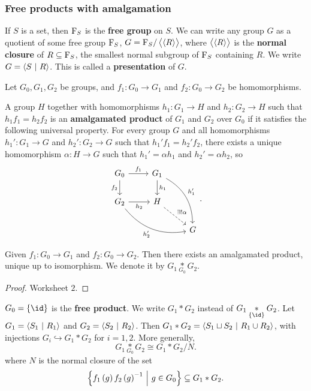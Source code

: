 \subsubsection{Free products with amalgamation}

\begin{definition*}
If $ S $ is a set, then $ \mathrm{F}_S $ is the \textbf{free group} on $ S $. We can write any group $ G $ as a quotient of some free group $ \mathrm{F}_S $, $ G = \mathrm{F}_S / \left\langle \left\langle R \right\rangle \right\rangle $, where $ \left\langle \left\langle R \right\rangle \right\rangle $ is the \textbf{normal closure} of $ R \subseteq \mathrm{F}_S $, the smallest normal subgroup of $ \mathrm{F}_S $ containing $ R $. We write $ G = \left\langle S \ \middle| \  R \right\rangle $. This is called a \textbf{presentation} of $ G $.
\end{definition*}

Let $ G_0, G_1, G_2 $ be groups, and $ f_1 : G_0 \to G_1 $ and $ f_2 : G_0 \to G_2 $ be homomorphisms.

\begin{definition*}
A group $ H $ together with homomorphisms $ h_1 : G_1 \to H $ and $ h_2 : G_2 \to H $ such that $ h_1f_1 = h_2f_2 $ is an \textbf{amalgamated product} of $ G_1 $ and $ G_2 $ over $ G_0 $ if it satisfies the following universal property. For every group $ G $ and all homomorphisms $ h_1' : G_1 \to G $ and $ h_2' : G_2 \to G $ such that $ h_1'f_1 = h_2'f_2 $, there exists a unique homomorphism $ \alpha : H \to G $ such that $ h_1' = \alpha h_1 $ and $ h_2' = \alpha h_2 $, so
$$
\begin{tikzcd}
G_0 \arrow{r}{f_1} \arrow[swap]{d}{f_2} & G_1 \arrow{d}{h_1} \arrow[bend left=30]{ddr}{h_1'} & \\
G_2 \arrow[swap]{r}{h_2} \arrow[bend right=30, swap]{drr}{h_2'} & H \arrow[dashed]{dr}{\exists !\alpha} & \\
& & G
\end{tikzcd}.
$$
\end{definition*}

\begin{theorem}
Given $ f_1 : G_0 \to G_1 $ and $ f_2 : G_0 \to G_2 $. Then there exists an amalgamated product, unique up to isomorphism. We denote it by
$ G_1 \underset{G_0}{*} G_2 $.
\end{theorem}

\begin{proof}
Worksheet $ 2 $.
\end{proof}


$ G_0 = \cbr{\id} $ is the \textbf{free product}. We write $ G_1 * G_2 $ instead of $ G_1 \underset{\cbr{\id}}{*} G_2 $. Let $ G_1 = \left\langle S_1 \ \middle| \  R_1 \right\rangle $ and $ G_2 = \left\langle S_2 \ \middle| \  R_2 \right\rangle $. Then $ G_1 * G_2 = \left\langle S_1 \sqcup S_2 \ \middle| \  R_1 \cup R_2 \right\rangle $, with injections $ G_i \hookrightarrow G_1 * G_2 $ for $ i = 1, 2 $. More generally,
$$ G_1 \underset{G_0}{*} G_2 \cong G_1 * G_2 / N. $$
where $ N $ is the normal closure of the set
$$ \cbr{f_1\br{g}f_2\br{g}^{-1} \st g \in G_0} \subseteq G_1 * G_2. $$

